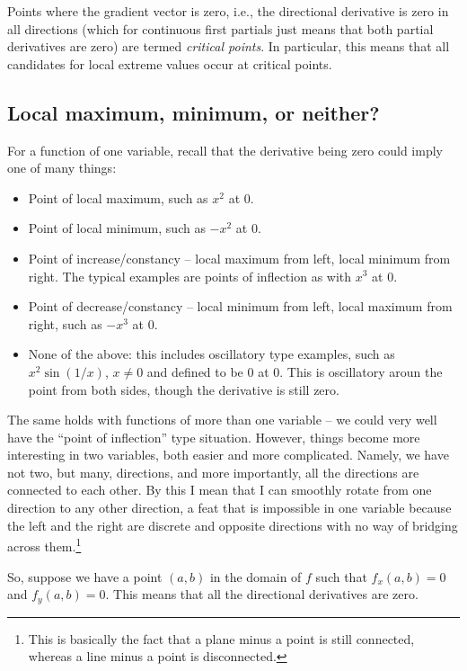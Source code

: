 \documentclass[10pt]{amsart}
\begin{document}
Points where the gradient vector is zero, i.e., the directional
derivative is zero in all directions (which for continuous first
partials just means that both partial derivatives are zero) are termed
{\em critical points}. In particular, this means that all candidates
for local extreme values occur at critical points.
\subsection{Local maximum, minimum, or neither?}

For a function of one variable, recall that the derivative being zero
could imply one of many things:

\begin{itemize}
\item Point of local maximum, such as $x^2$ at $0$.
\item Point of local minimum, such as $-x^2$ at $0$.
\item Point of increase/constancy -- local maximum from left, local
  minimum from right. The typical examples are points of inflection as
  with $x^3$ at $0$.
\item Point of decrease/constancy -- local minimum from left, local
  maximum from right, such as $-x^3$ at $0$.
\item None of the above: this includes oscillatory type examples, such
  as $x^2\sin(1/x)$, $x \ne 0$ and defined to be $0$ at $0$. This is
  oscillatory aroun the point from both sides, though the derivative
  is still zero.
\end{itemize}

The same holds with functions of more than one variable -- we could
very well have the ``point of inflection'' type situation. However,
things become more interesting in two variables, both easier and more
complicated. Namely, we have not two, but many, directions, and more
importantly, all the directions are connected to each other. By this I
mean that I can smoothly rotate from one direction to any other
direction, a feat that is impossible in one variable because the left
and the right are discrete and opposite directions with no way of
bridging across them.\footnote{This is basically the fact that a plane
minus a point is still connected, whereas a line minus a point is
disconnected.}

So, suppose we have a point $(a,b)$ in the domain of $f$ such that
$f_x(a,b) = 0$ and $f_y(a,b) = 0$. This means that all the directional
derivatives are zero.
\end{document}

